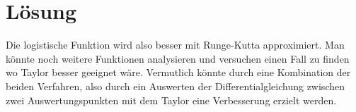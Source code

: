 %
%
%
\section{Lösung
\label{taylor:section:loesung}}
Die logistische Funktion wird also besser mit Runge-Kutta approximiert.
Man könnte noch weitere Funktionen analysieren und versuchen einen Fall zu finden wo Taylor besser geeignet wäre.
Vermutlich könnte durch eine Kombination der beiden Verfahren, also durch ein Auswerten der Differentialgleichung zwischen zwei Auswertungspunkten mit dem Taylor eine Verbesserung erzielt werden.



